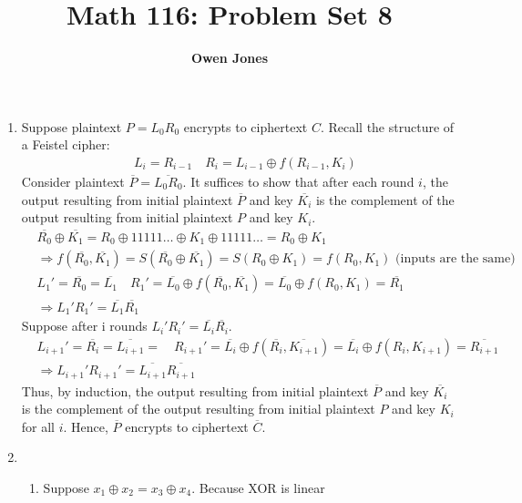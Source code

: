 \documentclass[10pt]{article}
\title{\bf Math 116: Problem Set 8}
\author{\bf Owen Jones}
\begin{document}
\maketitle
\begin{enumerate}[label= \arabic*.]
    \item Suppose plaintext $P=L_0R_0$ encrypts to ciphertext $C$. 
    Recall the structure of a Feistel cipher:
    \begin{align*}
        &L_i=R_{i-1}\quad R_i=L_{i-1}\oplus f(R_{i-1},K_i)
    \end{align*}
    Consider plaintext $\overline{P}=\overline{L_0R_0}$. 
    It suffices to show that after each round $i$, the output resulting from initial plaintext $\overline{P}$ and key $\overline{K_i}$ is the complement of the output resulting from initial plaintext $P$ and key $K_i$.
    \begin{align*}
        &\overline{R_0}\oplus\overline{K_1}=R_0\oplus 11111\ldots\oplus K_1\oplus 11111\ldots=R_0\oplus K_1\\
        &\Rightarrow f(\overline{R_0},\overline{K_1})=S(\overline{R_0}\oplus\overline{K_1})=S(R_0\oplus K_1)=f(R_{0},K_1)\text{ (inputs are the same)}\\
        &L_1'=\overline{R_0}=\overline{L_1}\quad R_1'=\overline{L_0}\oplus f(\overline{R_0},\overline{K_1})=\overline{L_0}\oplus f(R_{0},K_1)=\overline{R_1}\\
        &\Rightarrow L_1'R_1'=\overline{L_1}\overline{R_1}
    \end{align*}
    Suppose after i rounds $L_i'R_i'=\overline{L_i}\overline{R_i}$.
    \begin{align*}
        &L_{i+1}'=\overline{R_i}=\overline{L_{i+1}}=\quad R_{i+1}'=\overline{L_i}\oplus f(\overline{R_i},\overline{K_{i+1}})=\overline{L_i}\oplus f(R_{i},K_{i+1})=\overline{R_{i+1}}\\
        &\Rightarrow L_{i+1}'R_{i+1}'=\overline{L_{i+1}}\overline{R_{i+1}}
    \end{align*}
    Thus, by induction, the output resulting from initial plaintext $\overline{P}$ and key $\overline{K_i}$ is the complement of the output resulting from initial plaintext $P$ and key $K_i$ for all $i$.
    Hence, $\overline{P}$ encrypts to ciphertext $\overline{C}$.
    \item \begin{enumerate}
        \item Suppose $x_1\oplus x_2=x_3\oplus x_4$. Because XOR is linear
        \begin{align*}

\end{align*}
\end{enumerate}
\end{enumerate}
\end{document}
